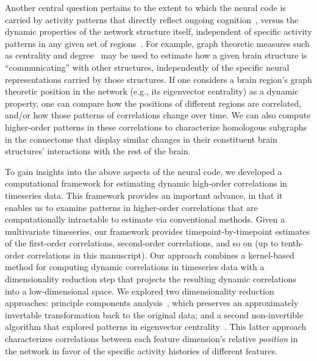 \documentclass[english]{article}
\begin{document}
Another central question pertains to the extent to which the neural
code is carried by activity patterns that directly reflect ongoing
cognition~\citep[e.g., following][]{HaxbEtal01, NormEtal06}, versus
the dynamic properties of the network structure itself, independent of
specific activity patterns in any given set of regions~\citep[e.g.,
following][]{BassEtal06}.  For example, graph theoretic measures such
as centrality and degree~\citep{BullSpor09} may be used to estimate
how a given brain structure is ``communicating'' with other
structures, independently of the specific neural representations
carried by those structures.  If one considers a brain region's graph
theoretic position in the network (e.g., its eigenvector centrality)
as a dynamic property, one can compare how the positions of different
regions are correlated, and/or how those patterns of correlations change
over time.  We can also compute higher-order patterns in these
correlations to characterize homologous subgraphs in the connectome
that display similar changes in their constituent brain structures'
interactions with the rest of the brain.

To gain insights into the above aspects of the neural code, we
developed a computational framework for estimating dynamic high-order
correlations in timeseries data. This framework provides an important
advance, in that it enables us to examine patterns in higher-order
correlations that are computationally intractable to estimate via
conventional methods.  Given a multivariate timeseries, our framework
provides timepoint-by-timepoint estimates of the first-order
correlations, second-order correlations, and so on (up to tenth-order
correlations in this manuscript).  Our approach combines a
kernel-based method for computing dynamic correlations in timeseries
data with a dimensionality reduction step that projects the resulting
dynamic correlations into a low-dimensional space.  We explored two
dimensionality reduction approaches: principle components
analysis~\citep[PCA;][]{Pear01}, which preserves an approximately invertable
transformation back to the original data; and a second non-invertible
algorithm that explored patterns in eigenvector
centrality~\citep{Land95}.  This latter approach characterizes
correlations between each feature dimension's relative
\textit{position} in the network in favor of the specific activity
histories of different features.
\end{document}
